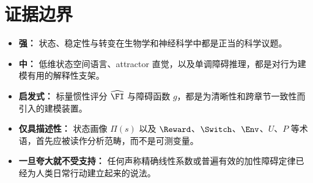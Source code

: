 \section{证据边界}

\begin{itemize}[nosep]
  \item \textbf{强：} 状态、稳定性与转变在生物学和神经科学中都是正当的科学议题。
  \item \textbf{中：} 低维状态空间语言、attractor 直觉，以及单调障碍推理，都是对行为建模有用的解释性支架。
  \item \textbf{启发式：} 标量惯性评分 $\widehat{\FI}$ 与障碍函数 $g$，都是为清晰性和跨章节一致性而引入的建模装置。
  \item \textbf{仅具描述性：} 状态画像 $\Pi(s)$ 以及 $\Reward$、$\Switch$、$\Env$、$U$、$P$ 等术语，首先应被读作分析范畴，而不是可测变量。
  \item \textbf{一旦夸大就不受支持：} 任何声称精确线性系数或普遍有效的加性障碍定律已经为人类日常行动建立起来的说法。
\end{itemize}